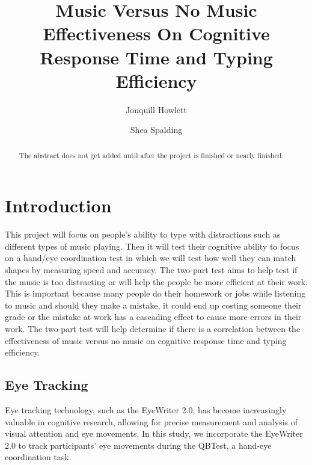 \documentclass[manuscript, screen]{acmart} %
\begin{document}
\title{Music Versus No Music Effectiveness On Cognitive Response Time and Typing Efficiency}

\author{Jonquill Howlett}

\author{Shea Spalding}

\renewcommand{\shortauthors}{Howlett, Spalding} %

\begin{abstract}
The abstract does not get added until after the project is finished or nearly finished.
\end{abstract}

\maketitle

\section{Introduction}
This project will focus on people's ability to type with distractions such as different types of music playing. Then it will test their cognitive ability to focus on a hand/eye coordination test in which we will test how well they can match shapes by measuring speed and accuracy. 
The two-part test aims to help test if the music is too distracting or will help the people be more efficient at their work. 
This is important because many people do their homework or jobs while listening to music and should they make a mistake, it could end up costing someone their grade or the mistake at work has a cascading effect to cause more errors in their work. 
The two-part test will help determine if there is a correlation between the effectiveness of music versus no music on cognitive response time and typing efficiency.

\subsection{Eye Tracking}
Eye tracking technology, such as the EyeWriter 2.0, has become increasingly valuable in cognitive research, allowing for precise measurement and analysis of visual attention and eye movements. In this study, we incorporate the EyeWriter 2.0 to track participants' eye movements during the QBTest, a hand-eye coordination task.
\end{document}
